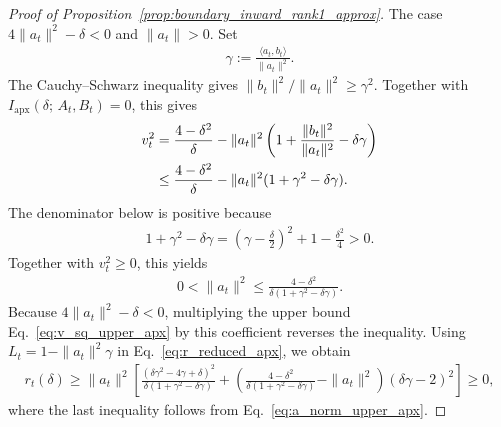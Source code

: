 \documentclass[10pt,a4paper]{amsart}
\newcommand{\iapx}{I_{\mathrm{apx}}}
\providecommand{\paragraph}{}
\begin{document}
\begin{proof}[Proof of Proposition~\ref{prop:boundary_inward_rank1_approx}]
\paragraph{The case $4\|a_t\|^2-\delta<0$ and $\|a_t\|>0$.}
Set
\begin{align}
    \gamma:=\frac{\langle a_t,b_t\rangle}{\|a_t\|^2}.
\end{align}
The Cauchy--Schwarz inequality gives
$\|b_t\|^2/\|a_t\|^2\ge\gamma^2$. Together with
$\iapx(\delta;\,A_t,B_t)=0$, this gives
\begin{align}
    v_t^2
    &=\frac{4-\delta^2}{\delta}
      -\|a_t\|^2
       \left(1+\frac{\|b_t\|^2}{\|a_t\|^2}-\delta\gamma\right)
      \notag\\
    &\le \frac{4-\delta^2}{\delta}
       -\|a_t\|^2(1+\gamma^2-\delta\gamma).
    \label{eq:v_sq_upper_apx}
\end{align}
The denominator below is positive because
\begin{align}
    1+\gamma^2-\delta\gamma
    =\left(\gamma-\frac{\delta}{2}\right)^2
     +1-\frac{\delta^2}{4}
    >0.
\end{align}
Together with $v_t^2\ge0$, this yields
\begin{align}
    0<\|a_t\|^2\le
    \frac{4-\delta^2}
         {\delta(1+\gamma^2-\delta\gamma)}.
    \label{eq:a_norm_upper_apx}
\end{align}
Because $4\|a_t\|^2-\delta<0$, multiplying the upper bound
Eq.~\eqref{eq:v_sq_upper_apx} by this coefficient reverses the inequality.
Using $L_t=1-\|a_t\|^2\gamma$ in Eq.~\eqref{eq:r_reduced_apx}, we obtain
\begin{align}
    r_t(\delta)
    \ge \|a_t\|^2\left[
        \frac{(\delta\gamma^2-4\gamma+\delta)^2}
             {\delta(1+\gamma^2-\delta\gamma)}
        +\left(
            \frac{4-\delta^2}
                 {\delta(1+\gamma^2-\delta\gamma)}-\|a_t\|^2
         \right)(\delta\gamma-2)^2
      \right]
    \ge0,
    \label{eq:r_apx_square_bound}
\end{align}
where the last inequality follows from
Eq.~\eqref{eq:a_norm_upper_apx}.


\end{proof}
\end{document}
